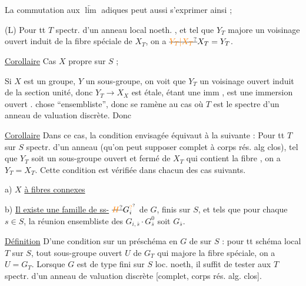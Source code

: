 La commutation aux $\underleftarrow{\lim}$ adiques peut aussi s'exprimer ainsi ;

(L) Pour tt  $T$  spectr. d'un anneau local noeth. , et tel que $Y_T$ majore un voisinage ouvert induit de la fibre spéciale de $X_T$, on a $\deleted{\unsure{Y_T|X_T}}X_T=Y_T$.

\uline{Corollaire} Cas $X$ propre sur $S$ ; 

Si $X$ est un groupe, $Y$ un sous-groupe, on voit que $Y_T$  un voisinage ouvert induit de la section unité, donc $Y_T\to X_X$ est  étale,  étant une imm , est une immersion ouvert .    chose ``ensembliste'', donc se ramène au cas où $T$ est le spectre d'un anneau de valuation discrète. Donc

\uline{Corollaire} Dans ce cas, la condition envisagée équivaut à la suivante : Pour tt $T$ sur $S$ spectr. d'un anneau   (qu'on peut supposer complet à corps rés. alg clos), tel que $Y_T$ soit un sous-groupe ouvert et fermé de $X_T$ qui contient la fibre , on a $Y_T=X_T$. Cette condition est vérifiée dans chacun des cas suivants.

a) $X$ \uline{à fibres connexes}

b) \uline{Il existe une famille de ss-} $\deleted{\unsure{H}}G_i^{\unsure{?}}$ de $G$, finis sur $S$, et tels que pour chaque $s\in S$, la réunion ensembliste des $G_{i,\bar s}\cdot G_{\bar s}^{0}$ soit $G_{\bar s}$.


\uline{Définition} D'une condition sur un préschéma en  $G$ de  sur $S$ :  pour tt schéma local $T$ sur $S$,  tout sous-groupe ouvert  $U$ de $G_T$ qui majore la fibre spéciale, on a $U=G_T$.
Lorsque  $G$ est de type fini sur $S$ loc. noeth, il suffit de tester aux $T$ spectr. d'un anneau de valuation discrète [complet, corps rés. alg. clos].

